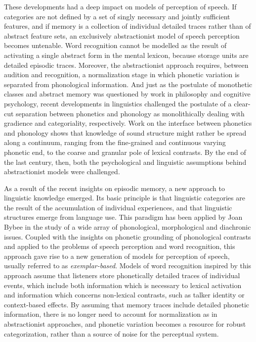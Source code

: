 These developments had a deep impact on models of perception of speech. If categories are not defined by a set of singly necessary and jointly sufficient features, and if memory is a collection of individual detailed traces rather than of abstract feature sets, an exclusively abstractionist model of speech perception becomes untenable. Word recognition cannot be modelled as the result of activating a single abstract form in the mental lexicon, because storage units are detailed episodic traces. Moreover, the abstractionist approach requires, between audition and recognition, a normalization stage in which phonetic variation is separated from phonological information. And just as the postulate of monothetic classes and abstract memory was questioned by work in philosophy and cognitive psychology, recent developments in linguistics challenged the postulate of a clear-cut separation between phonetics and phonology as monolithically dealing with gradience and categoriality, respectively. Work on the interface between phonetics and phonology shows that knowledge of sound structure might rather be spread along a continuum, ranging from the fine-grained and continuous varying phonetic end, to the coarse and granular pole of lexical contrasts. By the end of the last century, then, both the psychological and linguistic assumptions behind abstractionist models were challenged.

As a result of the recent insights on episodic memory, a new approach to linguistic knowledge emerged. Its basic principle is that linguistic categories are the result of the accumulation of individual experiences, and that linguistic structures emerge from language use. This paradigm has been applied by Joan Bybee in the study of a wide array of phonological, morphological and diachronic issues. Coupled with the insights on phonetic grounding of phonological contrasts and applied to the problems of speech perception and word recognition, this approach gave rise to a new generation of models for perception of speech, usually referred to as \textit{exemplar-based}. Models of word recognition inspired by this approach assume that listeners store phonetically detailed traces of individual events, which include both information which is necessary to lexical activation and information which concerns non-lexical contrasts, such as talker identity or context-based effects. By assuming that memory traces include detailed phonetic information, there is no longer need to account for normalization as in abstractionist approaches, and phonetic variation becomes a resource for robust categorization, rather than a source of noise for the perceptual system.

